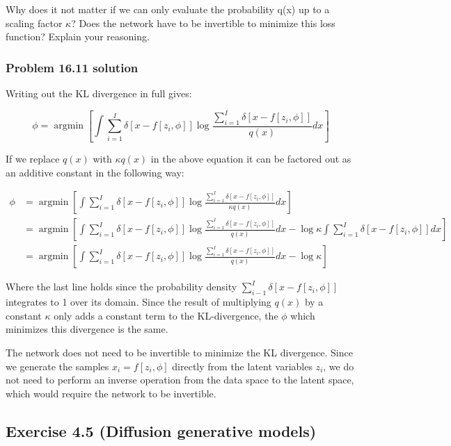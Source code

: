 \documentclass[
10pt, %
a4paper, %
oneside, %
headinclude,footinclude, %
BCOR5mm, %
]{scrartcl}
\DeclareMathOperator*{\argmin}{argmin} %
\begin{document}
Why does it not matter if we can only evaluate the probability q(x) up to a scaling factor $\kappa$? Does the network have to be invertible to minimize this loss function? Explain your reasoning.

\subsubsection*{Problem 16.11 solution}

Writing out the KL divergence in full gives:

\begin{equation*}
  \phi = \argmin \left[ \int \sum_{i=1}^I \delta[x-f[z_i,\phi]] \log \frac{\sum_{i=1}^I \delta[x-f[z_i,\phi]]}{q(x)} dx \right]
\end{equation*}

If we replace $q(x)$ with $\kappa q(x)$ in the above equation it can be factored out as an additive constant in the following way:

\begin{align*}
  \phi &= \argmin \left[ \int \sum_{i=1}^I \delta[x-f[z_i,\phi]] \log \frac{\sum_{i=1}^I \delta[x-f[z_i,\phi]]}{\kappa q(x)} dx \right] \\
  &= \argmin \left[ \int \sum_{i=1}^I \delta[x-f[z_i,\phi]] \log \frac{\sum_{i=1}^I \delta[x-f[z_i,\phi]]}{q(x)} dx - \log \kappa \int \sum_{i=1}^I \delta[x-f[z_i,\phi]] dx \right] \\
  &= \argmin \left[ \int \sum_{i=1}^I \delta[x-f[z_i,\phi]] \log \frac{\sum_{i=1}^I \delta[x-f[z_i,\phi]]}{q(x)} dx - \log \kappa \right]
\end{align*}

Where the last line holds since the probability density $\sum_{i-1}^I \delta[x-f[z_i,\phi]]$ integrates to 1 over its domain. Since the result of multiplying $q(x)$ by a constant $\kappa$ only adds a constant term to the KL-divergence, the $\phi$ which minimizes this divergence is the same.

The network does not need to be invertible to minimize the KL divergence. Since we generate the samples $x_i = f[z_i , \phi]$ directly from the latent variables $z_i$, we do not need to perform an inverse operation from the data space to the latent space, which would require the network to be invertible.

\newpage

\subsection*{Exercise 4.5 (Diffusion generative models)}
\end{document}
